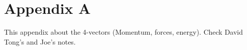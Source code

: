 
\section{Appendix A}
This appendix about the 4-vectors (Momentum, forces, energy). Check David Tong's and Joe's notes. 
